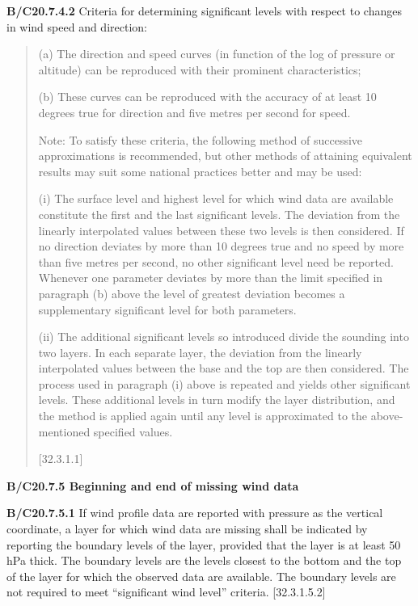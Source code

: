 \textbf{B/C20.7.4.2} Criteria for determining significant levels with respect to changes in wind speed and direction:

\begin{quote}
(a) The direction and speed curves (in function of the log of pressure or altitude) can be reproduced with their prominent characteristics;

(b) These curves can be reproduced with the accuracy of at least 10 degrees true for direction and five metres per second for speed.

Note: To satisfy these criteria, the following method of successive approximations is recommended, but other methods of attaining equivalent results may suit some national practices better and may be used:

(i) The surface level and highest level for which wind data are available constitute the first and the last significant levels. The deviation from the linearly interpolated values between these two levels is then considered. If no direction deviates by more than 10 degrees true and no speed by more than five metres per second, no other significant level need be reported. Whenever one parameter deviates by more than the limit specified in paragraph (b) above the level of greatest deviation becomes a supplementary significant level for both parameters.

(ii) The additional significant levels so introduced divide the sounding into two layers. In each separate layer, the deviation from the linearly interpolated values between the base and the top are then considered. The process used in paragraph (i) above is repeated and yields other significant levels. These additional levels in turn modify the layer distribution, and the method is applied again until any level is approximated to the above-mentioned specified values.

{[}32.3.1.1{]}
\end{quote}

\textbf{B/C20.7.5 Beginning and end of missing wind data}

\textbf{B/C20.7.5.1} If wind profile data are reported with pressure as the vertical coordinate, a layer for which wind data are missing shall be indicated by reporting the boundary levels of the layer, provided that the layer is at least 50 hPa thick. The boundary levels are the levels closest to the bottom and the top of the layer for which the observed data are available. The boundary levels are not required to meet ``significant wind level'' criteria. {[}32.3.1.5.2{]}

